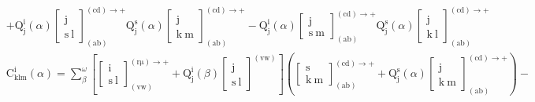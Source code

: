 \documentclass[12pt]{article}
\begin{document}
\begin{itemize}
\begin{equation}
\begin{aligned}
    & + \mathrm{Q}^{\mathrm{i}}_{\mathrm{j}}(\alpha) \left[ \begin{matrix} \mathrm{j} \\ \mathrm{s\ l} \end{matrix} \right]^{(\mathrm{cd}) \rightarrow +}_{(\mathrm{ab})} \mathrm{Q}^{\mathrm{s}}_{\mathrm{j}}(\alpha) \left[ \begin{matrix} \mathrm{j} \\ \mathrm{k\ m} \end{matrix} \right]^{(\mathrm{cd}) \rightarrow +}_{(\mathrm{ab})} - \mathrm{Q}^{\mathrm{i}}_{\mathrm{j}}(\alpha) \left[ \begin{matrix} \mathrm{j} \\ \mathrm{s\ m} \end{matrix} \right]^{(\mathrm{cd}) \rightarrow +}_{(\mathrm{ab})} \mathrm{Q}^{\mathrm{s}}_{\mathrm{j}}(\alpha) \left[ \begin{matrix} \mathrm{j} \\ \mathrm{k\ l} \end{matrix} \right]^{(\mathrm{cd}) \rightarrow +}_{(\mathrm{ab})}
    \end{aligned} \tag{99a}
    \end{equation}
    \begin{equation}
    \begin{aligned}
    & \mathrm{C}^{\mathrm{i}}_{\mathrm{klm}}(\alpha) = \sum_\beta^\omega \left[ \left[ \begin{matrix} \mathrm{i} \\ \mathrm{s\ l} \end{matrix} \right]^{(\mathrm{r\mu}) \rightarrow +}_{(\mathrm{vw})} + \mathrm{Q}^{\mathrm{i}}_{\mathrm{j}}(\beta) \left[ \begin{matrix} \mathrm{j} \\ \mathrm{s\ l} \end{matrix} \right]^{(\mathrm{vw})} \right] \left( \left[ \begin{matrix} \mathrm{s} \\ \mathrm{k\ m} \end{matrix} \right]^{(\mathrm{cd}) \rightarrow +}_{(\mathrm{ab})} + \mathrm{Q}^{\mathrm{s}}_{\mathrm{j}}(\alpha) \left[ \begin{matrix} \mathrm{j} \\ \mathrm{k\ m} \end{matrix} \right]^{(\mathrm{cd}) \rightarrow +}_{(\mathrm{ab})} \right) - \\

\end{aligned}
\end{equation}
\end{itemize}
\end{document}
